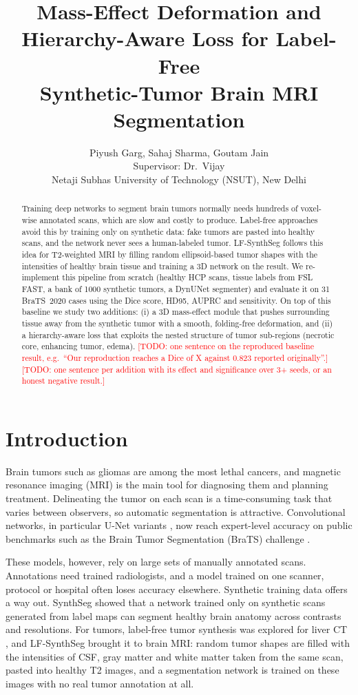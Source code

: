 \documentclass[10pt,a4paper,twocolumn,twoside]{article}
\title{Mass-Effect Deformation and Hierarchy-Aware Loss for Label-Free\\
Synthetic-Tumor Brain MRI Segmentation}
\author{Piyush Garg, Sahaj Sharma, Goutam Jain\\
\small Supervisor: Dr.\ Vijay\\
\small Netaji Subhas University of Technology (NSUT), New Delhi}
\date{}
\newcommand{\todo}[1]{\textcolor{red}{[TODO: #1]}}
\begin{document}
\maketitle

\begin{abstract}
Training deep networks to segment brain tumors normally needs hundreds of
voxel-wise annotated scans, which are slow and costly to produce.
Label-free approaches avoid this by training only on synthetic data:
fake tumors are pasted into healthy scans, and the network never sees a
human-labeled tumor. LF-SynthSeg \cite{lfsynthseg} follows this idea for
T2-weighted MRI by filling random ellipsoid-based tumor shapes with the
intensities of healthy brain tissue and training a 3D network on the result.
We re-implement this pipeline from scratch (healthy HCP scans, tissue
labels from FSL FAST, a bank of 1000 synthetic tumors, a DynUNet
segmenter) and evaluate it on 31 BraTS~2020 cases using the Dice score,
HD95, AUPRC and sensitivity. On top of this baseline we study two
additions: (i) a 3D mass-effect module that pushes surrounding tissue away
from the synthetic tumor with a smooth, folding-free deformation, and
(ii) a hierarchy-aware loss that exploits the nested structure of tumor
sub-regions (necrotic core, enhancing tumor, edema). \todo{one sentence on
the reproduced baseline result, e.g.\ ``Our reproduction reaches a Dice of X
against 0.823 reported originally''.} \todo{one sentence per addition with
its effect and significance over 3+ seeds, or an honest negative result.}
\end{abstract}

\section{Introduction}
Brain tumors such as gliomas are among the most lethal cancers, and magnetic
resonance imaging (MRI) is the main tool for diagnosing them and planning
treatment. Delineating the tumor on each scan is a time-consuming task that
varies between observers, so automatic segmentation is attractive.
Convolutional networks, in particular U-Net variants
\cite{unet,nnunet}, now reach expert-level accuracy on public benchmarks such as
the Brain Tumor Segmentation (BraTS) challenge \cite{menze,bakas}.

These models, however, rely on large sets of manually annotated scans.
Annotations need trained radiologists, and a model trained on one scanner,
protocol or hospital often loses accuracy elsewhere. Synthetic training data
offers a way out. SynthSeg \cite{synthseg} showed that a network trained
only on synthetic scans generated from label maps can segment healthy brain
anatomy across contrasts and resolutions. For tumors, label-free
tumor synthesis was explored for liver CT \cite{labelfree_liver}, and
LF-SynthSeg \cite{lfsynthseg} brought it to brain MRI: random tumor shapes are
filled with the intensities of CSF, gray matter and white matter taken from
the same scan, pasted into healthy T2 images, and a segmentation network is
trained on these images with no real tumor annotation at all.
\end{document}
